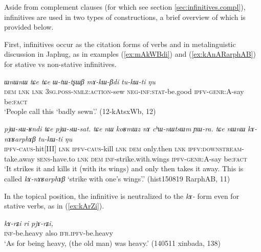 \documentclass[oneside,a4paper,11pt]{article}
\newcommand{\ipa}[1]{\textit{\phon#1}}
\begin{document}
Aside from complement clauses (for which see section \ref{sec:infinitives.compl}), infinitives are used in two types of constructions, a brief overview of which is provided below.

First, infinitives occur as the citation forms of verbs and in metalinguistic discussion in Japhug, as in examples (\ref{ex:mAkWBdi}) and (\ref{ex:kAnARarphAB}) for stative vs non-stative infinitives.%

\begin{exe}
\ex  \label{ex:mAkWBdi}
 \gll \ipa{ɯnɯnɯ} 	\ipa{tɕe} 	\ipa{tɕe} 	\ipa{ɯ-tɯ-tʂɯβ} 	\ipa{mɤ-kɯ-βdi} 	\ipa{tu-kɯ-ti} 	\ipa{ŋu} \\ 
 \textsc{dem} \textsc{lnk} \textsc{lnk} \textsc{3sg.poss-nmlz:action}-sew \textsc{neg-inf:stat}-be.good  \textsc{ipfv-genr}:A-say be:\textsc{fact}  \\
\glt `People call this `badly sewn'.'  (12-kAtsxWb, 12)
\end{exe}

\begin{exe}
\ex \label{ex:kAnARarphAB}
 \gll \ipa{pjɯ-sɯ-ʁndi} 	\ipa{tɕe} 	\ipa{pjɯ-sɯ-sat.} \ipa{tɕe} 	\ipa{nɯ} 	\ipa{koʁmɯz} 	\ipa{nɤ} 	\ipa{cʰɯ-nɯtsɯm} 	\ipa{ɲɯ-ra.} \ipa{tɕe} 	\ipa{nɯnɯ} 	\ipa{kɤ-nɤʁarphɤβ} 	\ipa{tu-kɯ-ti} 	\ipa{ŋu} \\
 \textsc{ipfv-caus}-hit[III]  \textsc{lnk} \textsc{ipfv-caus}-kill \textsc{lnk} \textsc{dem} only.then \textsc{lnk} \textsc{ipfv:downstream}-take.away \textsc{sens}-have.to \textsc{lnk} \textsc{dem} \textsc{inf}-strike.with.wings \textsc{ipfv-genr}:A-say be:\textsc{fact}  \\
 \glt `It strikes it and kills it (with its wings) and only then takes it away. This is called \ipa{kɤ-nɤʁarphɤβ} `strike with one's wings'.' (hist150819 RarphAB, 11)
\end{exe}

In the topical position, the infinitive is neutralized to the \ipa{kɤ-} form even for stative verbs, as in (\ref{ex:kArZi}).

\begin{exe}
\ex \label{ex:kArZi}
 \gll
 \ipa{kɤ-rʑi} 	\ipa{ri} 	\ipa{pjɤ-rʑi,} 	  \\
 \textsc{inf}-be.heavy also \textsc{ifr.ipfv}-be.heavy \\
 \glt `As for being heavy, (the old man) was heavy.'  (140511 xinbada, 138)
\end{exe}
\end{document}
